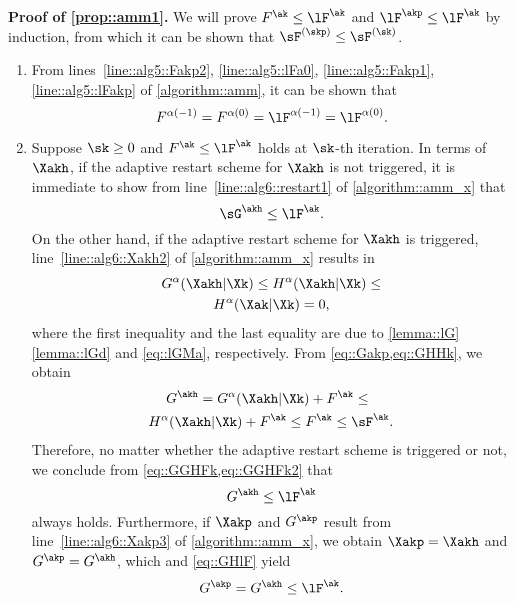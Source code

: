 \noindent\textbf{Proof of \ref{prop::amm1}.\;}  We will prove $F^{\ak}\leq \lF^{\ak}$ and $\lF^{\akp}\leq \lF^{\ak}$ by induction, from which it can be shown that $\sF^{(\skp)}\leq \sF^{(\sk)}$.
\begin{enumerate}[leftmargin=0.5cm]
	\item From lines~\ref{line::alg5::Fakp2}, \ref{line::alg5::lFa0}, \ref{line::alg5::Fakp1}, \ref{line::alg5::lFakp} of \cref{algorithm::amm}, it can be shown that 
	\begin{equation}
		\nonumber
		F^{\alpha(-1)}=F^{\alpha(0)}=\lF^{\alpha(-1)}=\lF^{\alpha(0)}.
	\end{equation}
	\item Suppose $\sk\geq 0$ and $F^{\ak}\leq \lF^{\ak}$ holds at $\sk$-th iteration. In terms of $\Xakh$, if the adaptive restart scheme  for $\Xakh$ is not triggered, it is immediate to show from line~\ref{line::alg6::restart1} of \cref{algorithm::amm_x} that
	\begin{equation}\label{eq::GGHFk2}
		\sG^{\akh}  \leq \lF^{\ak}.
	\end{equation}
	On the other hand, if the adaptive restart scheme for $\Xakh$ is triggered, line~\ref{line::alg6::Xakh2} of \cref{algorithm::amm_x} results in
	\begin{multline}\label{eq::GHHk}
	 G^{\alpha}(\Xakh|\Xk) \leq	H^{\alpha}(\Xakh|\Xk)\leq\\  H^{\alpha}(\Xak|\Xk) = 0,
	\end{multline}
	where the first inequality and the last equality are due to \cref{lemma::lG}\ref{lemma::lGd} and \cref{eq::lGMa}, respectively. From \cref{eq::Gakp,eq::GHHk}, we obtain
	\begin{multline}\label{eq::GGHFk}
	\!\!\!G^{\akh} = G^\alpha(\Xakh|\Xk) + F^{\ak}\leq\\
	 H^\alpha(\Xakh|\Xk) + F^{\ak}\leq F^{\ak}\leq \sF^{\ak}.
	\end{multline}
	Therefore, no matter whether the adaptive restart scheme is triggered or not, we conclude from \cref{eq::GGHFk,eq::GGHFk2} that
	\begin{equation}\label{eq::GHlF}
		G^{\akh}\leq  \lF^{\ak}
	\end{equation}
	always holds. Furthermore, if $\Xakp$ and $G^{\akp}$ result from line~\ref{line::alg6::Xakp3} of \cref{algorithm::amm_x}, we obtain $\Xakp=\Xakh$ and $G^{\akp}=G^{\akh}$, which and \cref{eq::GHlF} yield
	\begin{equation}\label{eq::GlFbnd2}
		G^{\akp}=G^{\akh}\leq \lF^{\ak}.
	\end{equation}

\end{enumerate}
